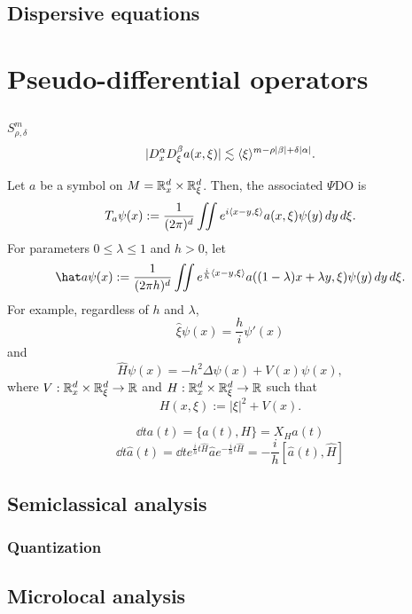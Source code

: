 \documentclass{../../large}
\begin{document}
\chapter{Dispersive equations}


\part{Pseudo-differential operators}
\chapter{}
\section{}
$S_{\rho,\delta}^m$
\[|D_x^\alpha D_\xi^\beta a(x,\xi)|\lesssim\langle\xi\rangle^{m-\rho|\beta|+\delta|\alpha|}.\]

Let $a$ be a symbol on $M=\mathbb{R}_x^d\times\mathbb{R}_\xi^d$.
Then, the associated $\Psi$DO is
\[T_a\psi(x):=\frac1{(2\pi)^d}\iint e^{i\langle x-y,\xi\rangle}a(x,\xi)\psi(y)\,dy\,d\xi.\]
For parameters $0\le\lambda\le1$ and $h>0$, let
\[\hat a\psi(x):=\frac1{(2\pi h)^d}\iint e^{\frac ih\<x-y,\xi\>}a((1-\lambda)x+\lambda y,\xi)\psi(y)\,dy\,d\xi.\]
For example, regardless of $h$ and $\lambda$,
\[\hat\xi\psi(x)=\frac hi\psi'(x)\]
and
\[\hat H\psi(x)=-h^2\Delta\psi(x)+V(x)\psi(x),\]
where $V:\mathbb{R}_x^d\times\mathbb{R}_\xi^d\to\mathbb{R}$ and $H:\mathbb{R}_x^d\times\mathbb{R}_\xi^d\to\mathbb{R}$ such that
\[H(x,\xi):=|\xi|^2+V(x).\]


\[\dd{t}a(t)=\{a(t),H\}=X_Ha(t)\]
\[\dd{t}\hat a(t)=\dd{t}e^{\frac iht\hat H}\hat ae^{-\frac iht\hat H}=-\frac ih[\hat a(t),\hat H]\]


\chapter{Semiclassical analysis}
\section{Quantization}
\begin{prb}

\end{prb}


\chapter{Microlocal analysis}
\end{document}
